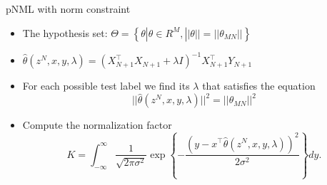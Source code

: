 \documentclass[aspectratio=169]{beamer}
\begin{document}
\begin{frame}{pNML with norm constraint}
\begin{itemize}
\item The hypothesis set:  $\Theta = \left\{\theta| \theta \in R^M, ||\theta|| = ||\theta_{MN}|| \right\}$
\item $\hat{\theta}(z^N,x,y,\lambda) = \left( X_{N+1}^\top  X_{N+1} + \lambda I\right)^{-1} X_{N+1}^\top Y_{N+1}$
\item For each possible test label we find its $\lambda$ that satisfies the equation
    \begin{equation} 
        ||\hat{\theta}(z^N,x,y,\lambda)||^2 = ||\theta_{MN}||^2
    \end{equation}
\item Compute the normalization factor
    \begin{equation}
    K
    = 
    \int_{-\infty}^\infty
    \frac{1}{\sqrt{2 \pi \sigma^2}} \exp \left\{-
    \frac{\left(y- x^\top \hat{\theta}(z^N,x,y,\lambda) \right)^2}{2 \sigma^2} \right\} dy.
    \end{equation}
\end{itemize}
\end{frame}
\end{document}
